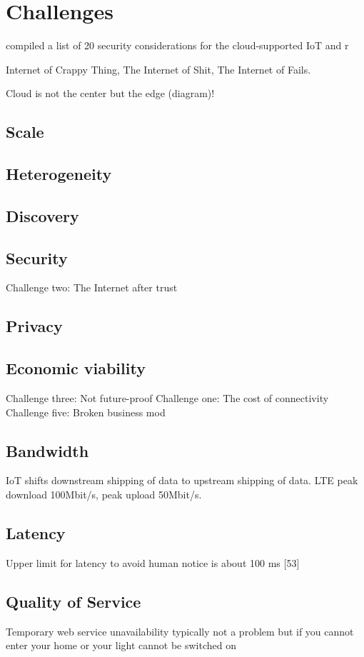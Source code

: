 \section{Challenges}
\cite{Singh2016} compiled a list of 20 security considerations for the cloud-supported IoT and r

Internet of Crappy Thing, The Internet of Shit, The Internet of Fails.

Cloud is not the center but the edge (diagram)!

\subsection{Scale}
\subsection{Heterogeneity}
\subsection{Discovery}
\subsection{Security}
Challenge two: The Internet after trust
\subsection{Privacy}
\subsection{Economic viability}
Challenge three: Not future-proof
Challenge one: The cost of connectivity
Challenge five: Broken business mod
\subsection{Bandwidth}
IoT shifts downstream shipping of data to upstream shipping of data. LTE peak download 100Mbit/s, peak upload 50Mbit/s.

\subsection{Latency}
Upper limit for latency to avoid human notice is about 100 ms [53]

\subsection{Quality of Service}
Temporary web service unavailability typically not a problem but if you cannot enter your home or your light cannot be switched on 



